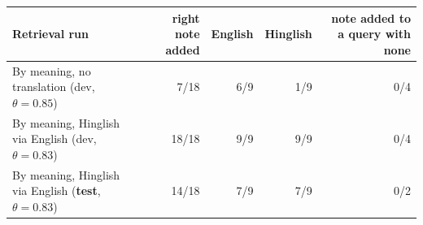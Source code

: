 \begin{tabular}{lrrrr}
\toprule
Retrieval run & right note added & English & Hinglish & note added to a query with none \\
\midrule
By meaning, no translation (dev, $\theta=0.85$) & 7/18 & 6/9 & 1/9 & 0/4 \\
By meaning, Hinglish via English (dev, $\theta=0.83$) & 18/18 & 9/9 & 9/9 & 0/4 \\
By meaning, Hinglish via English (\textbf{test}, $\theta=0.83$) & 14/18 & 7/9 & 7/9 & 0/2 \\
\bottomrule
\end{tabular}
